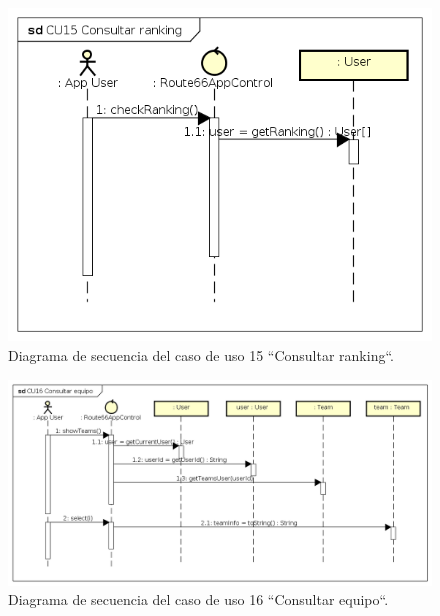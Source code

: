 \documentclass[twoside]{report}
\begin{document}
\begin{figure}[H]
\begin{center}
\includegraphics[scale=0.7]{images/sequence/CU15}
\caption{Diagrama de secuencia del caso de uso 15 “Consultar ranking“.}
\end{center}
\end{figure}

\begin{figure}[H]
\begin{center}
\includegraphics[width=\textwidth]{images/sequence/CU16}
\caption{Diagrama de secuencia del caso de uso 16 “Consultar equipo“.}
\end{center}
\end{figure}
\end{document}
